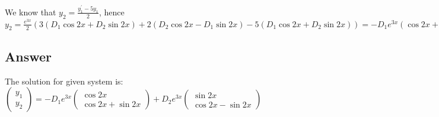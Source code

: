 We know that $y_2 = \frac{y_1^{\prime} - 5y_1}{2}$, hence $y_2 = \frac{e^{3x}}{2} (3(D_1 \cos{2x} + D_2 \sin{2x}) + 2(D_2 \cos{2x} - D_1 \sin{2x}) - 5(D_1 \cos{2x} + D_2 \sin{2x})) = -D_1 e^{3x} (\cos{2x} + \sin{2x}) + D_2(\cos{2x} - \sin{2x})$

\subsection*{Answer}

The solution for given system is: $\begin{pmatrix}
y_1 \\ y_2
\end{pmatrix} = - D_1 e^{3x} \begin{pmatrix}
    \cos{2x} \\ \cos{2x} + \sin{2x}
\end{pmatrix} + D_2 e^{3x} \begin{pmatrix}
    \sin{2x} \\ \cos{2x} - \sin{2x}
\end{pmatrix}$